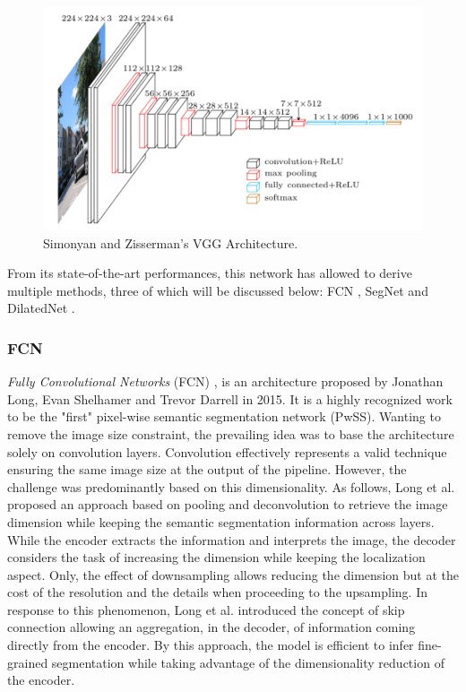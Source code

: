 \begin{figure}[h]
	\centering
	\includegraphics[width=0.5\linewidth]{Figures/SOA/VGG}
	\caption[Simonyan and Zisserman's VGG Architecture.]{Simonyan and Zisserman's \cite{simonyan2014very} VGG Architecture.}
	\label{fig:vgg}
\end{figure}


From its state-of-the-art performances, this network has allowed to derive multiple methods, three of which will be discussed below: FCN \cite{long2015fully}, SegNet \cite{DBLP:journals/corr/BadrinarayananH15} and DilatedNet \cite{yu2015multi}.

\subsubsection{FCN}

\emph{Fully Convolutional Networks} (FCN) \cite{long2015fully}, is an architecture proposed by Jonathan Long, Evan Shelhamer and Trevor Darrell in 2015. It is a highly recognized work to be the "first" pixel-wise semantic segmentation network (PwSS). Wanting to remove the image size constraint, the prevailing idea was to base the architecture solely on convolution layers. Convolution effectively represents a valid technique ensuring the same image size at the output of the pipeline. 
However, the challenge was predominantly based on this dimensionality. As follows, Long et al. proposed an approach based on pooling and deconvolution to retrieve the image dimension while keeping the semantic segmentation information across layers.
While the encoder extracts the information and interprets the image, the decoder considers the task of increasing the dimension while keeping the localization aspect. Only, the effect of downsampling allows reducing the dimension but at the cost of the resolution and the details when proceeding to the upsampling. In response to this phenomenon, Long et al. introduced the concept of skip connection allowing an aggregation, in the decoder, of information coming directly from the encoder. By this approach, the model is efficient to infer fine-grained segmentation while taking advantage of the dimensionality reduction of the encoder.


